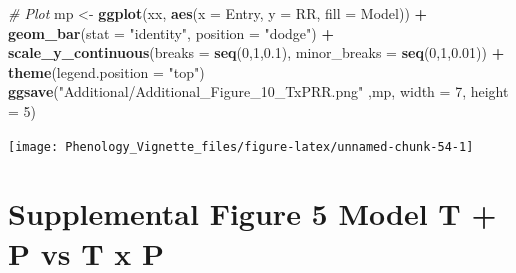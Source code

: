 \documentclass[
]{article}
\newenvironment{Shaded}{\begin{snugshade}}{\end{snugshade}}
\newcommand{\CommentTok}[1]{\textcolor[rgb]{0.56,0.35,0.01}{\textit{#1}}}
\newcommand{\DataTypeTok}[1]{\textcolor[rgb]{0.13,0.29,0.53}{#1}}
\newcommand{\DecValTok}[1]{\textcolor[rgb]{0.00,0.00,0.81}{#1}}
\newcommand{\FloatTok}[1]{\textcolor[rgb]{0.00,0.00,0.81}{#1}}
\newcommand{\KeywordTok}[1]{\textcolor[rgb]{0.13,0.29,0.53}{\textbf{#1}}}
\newcommand{\NormalTok}[1]{#1}
\newcommand{\OperatorTok}[1]{\textcolor[rgb]{0.81,0.36,0.00}{\textbf{#1}}}
\newcommand{\StringTok}[1]{\textcolor[rgb]{0.31,0.60,0.02}{#1}}
\begin{document}
\begin{Shaded}
\begin{Highlighting}[]
\CommentTok{# Plot}
\NormalTok{mp <-}\StringTok{ }\KeywordTok{ggplot}\NormalTok{(xx, }\KeywordTok{aes}\NormalTok{(}\DataTypeTok{x =}\NormalTok{ Entry, }\DataTypeTok{y =}\NormalTok{ RR, }\DataTypeTok{fill =}\NormalTok{ Model)) }\OperatorTok{+}\StringTok{ }
\StringTok{  }\KeywordTok{geom_bar}\NormalTok{(}\DataTypeTok{stat =} \StringTok{"identity"}\NormalTok{, }\DataTypeTok{position =} \StringTok{"dodge"}\NormalTok{) }\OperatorTok{+}
\StringTok{  }\KeywordTok{scale_y_continuous}\NormalTok{(}\DataTypeTok{breaks =} \KeywordTok{seq}\NormalTok{(}\DecValTok{0}\NormalTok{,}\DecValTok{1}\NormalTok{,}\FloatTok{0.1}\NormalTok{), }\DataTypeTok{minor_breaks =} \KeywordTok{seq}\NormalTok{(}\DecValTok{0}\NormalTok{,}\DecValTok{1}\NormalTok{,}\FloatTok{0.01}\NormalTok{)) }\OperatorTok{+}
\StringTok{  }\KeywordTok{theme}\NormalTok{(}\DataTypeTok{legend.position =} \StringTok{"top"}\NormalTok{) }
\KeywordTok{ggsave}\NormalTok{(}\StringTok{"Additional/Additional_Figure_10_TxPRR.png"}\NormalTok{ ,mp, }\DataTypeTok{width =} \DecValTok{7}\NormalTok{, }\DataTypeTok{height =} \DecValTok{5}\NormalTok{)}
\end{Highlighting}
\end{Shaded}

\texttt{[image: Phenology\_Vignette\_files/figure-latex/unnamed-chunk-54-1]}

\hypertarget{supplemental-figure-5-model-t-p-vs-t-x-p}{%
\section{Supplemental Figure 5 Model T + P vs T x
P}\label{supplemental-figure-5-model-t-p-vs-t-x-p}}
\end{document}
